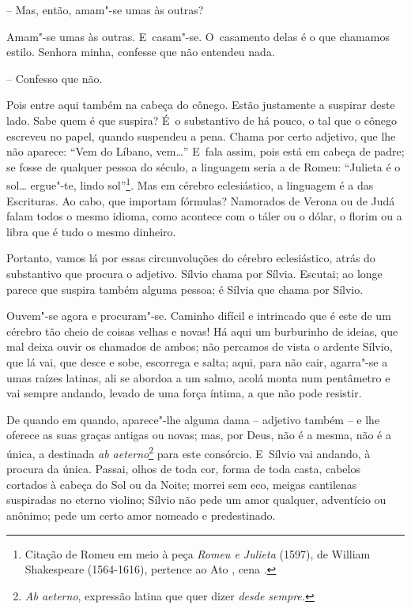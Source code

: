 -- Mas, então, amam"-se umas às outras?

Amam"-se umas às outras. E~casam"-se. O~casamento delas é o que chamamos
estilo. Senhora minha, confesse que não entendeu nada.

-- Confesso que não.

Pois entre aqui também na cabeça do cônego. Estão justamente a suspirar
deste lado. Sabe quem é que suspira? É~o substantivo de há pouco, o tal
que o cônego escreveu no papel, quando suspendeu a pena. Chama por certo
adjetivo, que lhe não aparece: ``Vem do Líbano, vem\ldots{}'' E~fala assim,
pois está em cabeça de padre; se fosse de qualquer pessoa do século, a
linguagem seria a de Romeu: ``Julieta é o sol\ldots{} ergue"-te, lindo
sol''\footnote{Citação de Romeu em meio à peça \emph{Romeu e Julieta}
  (1597), de William Shakespeare (1564-1616), pertence ao Ato , cena
  .}. Mas em cérebro eclesiástico, a linguagem é a das Escrituras. Ao
cabo, que importam fórmulas? Namorados de Verona ou de Judá falam todos
o mesmo idioma, como acontece com o táler ou o dólar, o florim ou a
libra que é tudo o mesmo dinheiro.

Portanto, vamos lá por essas circunvoluções do cérebro eclesiástico,
atrás do substantivo que procura o adjetivo. Sílvio chama por Sílvia.
Escutai; ao longe parece que suspira também alguma pessoa; é Sílvia que
chama por Sílvio.

Ouvem"-se agora e procuram"-se. Caminho difícil e intrincado que é este de
um cérebro tão cheio de coisas velhas e novas! Há aqui um burburinho de
ideias, que mal deixa ouvir os chamados de ambos; não percamos de vista
o ardente Sílvio, que lá vai, que desce e sobe, escorrega e salta; aqui,
para não cair, agarra"-se a umas raízes latinas, ali se abordoa a um
salmo, acolá monta num pentâmetro e vai sempre andando, levado de uma
força íntima, a que não pode resistir.

De quando em quando, aparece"-lhe alguma dama -- adjetivo também -- e lhe
oferece as suas graças antigas ou novas; mas, por Deus, não é a mesma,
não é a única, a destinada \emph{ab aeterno}\footnote{\emph{Ab aeterno},
  expressão latina que quer dizer \emph{desde sempre. }} para este
consórcio. E~Sílvio vai andando, à procura da única. Passai, olhos de
toda cor, forma de toda casta, cabelos cortados à cabeça do Sol ou da
Noite; morrei sem eco, meigas cantilenas suspiradas no eterno violino;
Sílvio não pede um amor qualquer, adventício ou anônimo; pede um certo
amor nomeado e predestinado.

